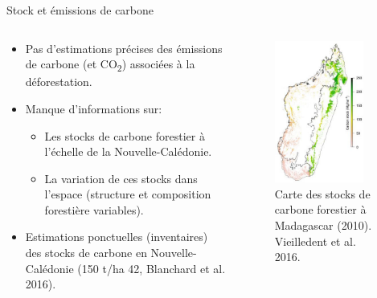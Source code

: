 \documentclass[10pt,table,dvipsnames,compress]{beamer}
\begin{document}
\begin{frame}[label={sec:org15399ca}]{Stock et émissions de carbone}
\begin{columns}
\begin{column}{0.6\columnwidth}
\begin{itemize}
\item Pas d'estimations précises des émissions de carbone (et CO\textsubscript{2}) associées à la déforestation.
\item Manque d'informations sur:
\begin{itemize}
\item Les stocks de carbone forestier à l'échelle de la Nouvelle-Calédonie.
\item La variation de ces stocks dans l'espace (structure et composition forestière variables).
\end{itemize}
\item Estimations ponctuelles (inventaires) des stocks de carbone en Nouvelle-Calédonie (150 t/ha \textpm{}42, Blanchard et al. 2016).
\end{itemize}
\end{column}

\begin{column}{0.4\columnwidth}
\begin{figure}[htbp]
\centering
\includegraphics[width=0.85\textwidth]{figs/Cstock_Mada.jpg}
\caption{Carte des stocks de carbone forestier à Madagascar (2010). Vieilledent et al. 2016.}
\end{figure}
\end{column}
\end{columns}
\end{frame}
\end{document}

